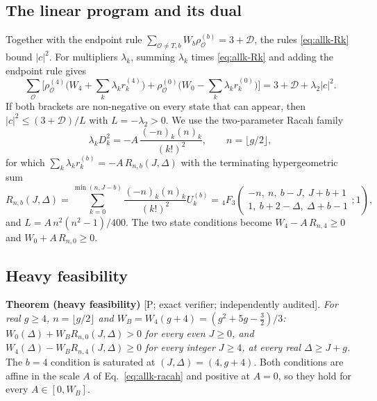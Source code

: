 \subsection{The linear program and its dual}
\label{sec:allk-dual}
Together with the endpoint rule $\sum_{\mathcal O\ne T,b}W_b\rho^{(b)}_{\mathcal O}=3+\mathcal D$, the rules \eqref{eq:allk-Rk} bound $|c|^2$. For
multipliers $\lambda_k$, summing $\lambda_k$ times \eqref{eq:allk-Rk} and adding the endpoint rule gives
\begin{equation}
\sum_{\mathcal O}\Big[\rho^{(4)}_{\mathcal O}\big(W_4+\textstyle\sum_k\lambda_kr^{(4)}_k\big)+\rho^{(0)}_{\mathcal O}\big(W_0-\sum_k\lambda_kr^{(0)}_k\big)\Big]
=3+\mathcal D+\lambda_2|c|^2 .
\label{eq:allk-dual}
\end{equation}
If both brackets are non-negative on every state that can appear, then $|c|^2\le(3+\mathcal D)/L$ with $L=-\lambda_2>0$. We use the
two-parameter Racah family
\begin{equation}
\lambda_kD_k^2=-A\,\frac{(-n)_k(n)_k}{(k!)^2},\qquad n=\lfloor g/2\rfloor,
\label{eq:allk-racah}
\end{equation}
for which $\sum_k\lambda_kr^{(b)}_k=-A\,R_{n,b}(J,\Delta)$ with the terminating hypergeometric sum
\begin{equation}
R_{n,b}(J,\Delta)=\sum_{k=0}^{\min(n,J-b)}\frac{(-n)_k(n)_k}{(k!)^2}U^{(b)}_k
={}_4F_3\!\left(\begin{matrix}-n,\ n,\ b-J,\ J+b+1\\1,\ b+2-\Delta,\ \Delta+b-1\end{matrix};1\right),
\label{eq:allk-R}
\end{equation}
and $L=A\,n^2(n^2-1)/400$. The two state conditions become $W_4-A\,R_{n,4}\ge0$ and $W_0+A\,R_{n,0}\ge0$.

\subsection{Heavy feasibility}
\label{sec:allk-heavy}
\textbf{Theorem (heavy feasibility)} [P; exact verifier; independently audited]. \emph{For real $g\ge4$, $n=\lfloor g/2\rfloor$ and
$W_B=W_4(g+4)=(g^2+5g-\tfrac32)/3$: $W_0(\Delta)+W_BR_{n,0}(J,\Delta)>0$ for every even $J\ge0$, and $W_4(\Delta)-W_BR_{n,4}(J,\Delta)\ge0$ for every
integer $J\ge4$, at every real $\Delta\ge J+g$.} The $b=4$ condition is saturated at $(J,\Delta)=(4,g+4)$. Both conditions are affine in the
scale $A$ of Eq.~\eqref{eq:allk-racah} and positive at $A=0$, so they hold for every $A\in[0,W_B]$.

